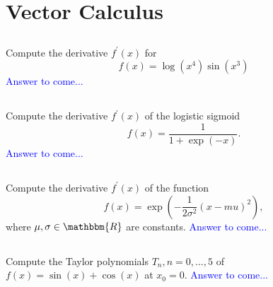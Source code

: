 \documentclass[a4paper,12pt]{article}
\newcommand{\R}{\mathbbm{R}}
\newcommand{\pr}{^\prime}
\begin{document}
\section{Vector Calculus}
\subsection{}
Compute the derivative $f\pr(x)$ for
$$f(x) = \log(x^4) \sin(x^3)$$
\textcolor{blue}{
Answer to come...
}
\subsection{}
Compute the derivative $f\pr(x)$ of the logistic sigmoid
$$f(x) = \dfrac{1}{1+\exp(-x)}.$$
\textcolor{blue}{
Answer to come...
}
\subsection{}
Compute the derivative $f\pr(x)$ of the function
$$f(x) = \exp(-\frac{1}{2\sigma^2}(x-mu)^2),$$
where $\mu, \sigma \in \R$ are constants.
\textcolor{blue}{
Answer to come...
}
\subsection{}
Compute the Taylor polynomials $T_n, n=0, ... , 5$ of $f(x) = \sin(x)+\cos(x)$ at $x_0=0$.
\textcolor{blue}{
Answer to come...
}
\end{document}
